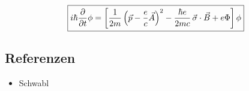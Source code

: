 \begin{align}
  \label{eq:18}
\boxed{   i\hbar\pdiff_t\phi =  \left[\frac{1}{2m}\left( \vec p - \frac{e}{c}\vec A\right)^2  -  \frac{\hbar e}{2mc}\, \vec \sigma\cdot\vec B   + e\Phi\right] \phi  }
\end{align}




\subsection*{Referenzen}
\begin{itemize}
\item Schwabl
\end{itemize}


